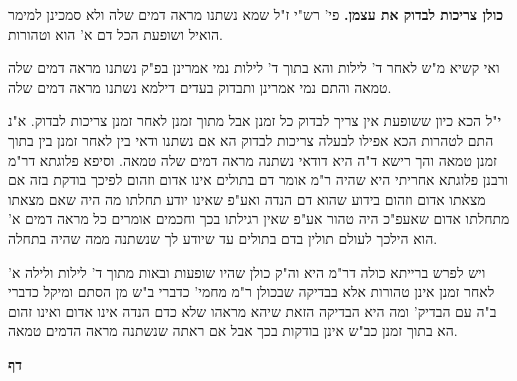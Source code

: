 \documentclass[12pt, openany]{book}
\newcommand{\sethebfont}{
\fontsize{10.5pt}{21.0pt} \selectfont
}
\newcommand{\twocol}[1]{
	{\sethebfont \begin{multicols}{2}
			#1
	\end{multicols}}	
}
\newcommand{\chapname}{}
\newcommand{\newchap}[1]{
	\addcontentsline{toc}{chapter}{#1}
	\renewcommand{\chapname}{#1}
		\begin{center}
			\textbf{%
\fontsize{16pt}{16pt}\selectfont
				#1}
		\end{center}
}
\begin{document}
\twocol{\textbf{כולן צריכות לבדוק את עצמן.}  פי' רש"י ז"ל שמא נשתנו מראה דמים שלה ולא סמכינן למימר הואיל ושופעת הכל דם א' הוא וטהורות.\par ואי קשיא מ"ש לאחר ד' לילות והא בתוך ד' לילות נמי אמרינן בפ"ק נשתנו מראה דמים שלה טמאה והתם נמי אמרינן ותבדוק בעדים דילמא נשתנו מראה דמים שלה.\par  י"ל הכא כיון ששופעת אין צריך לבדוק כל זמנן אבל מתוך זמנן לאחר זמנן צריכות לבדוק. א"נ התם לטהרות הכא אפילו לבעלה צריכות לבדוק הא אם נשתנו ודאי בין לאחר זמנן בין בתוך זמנן טמאה והך רישא ד"ה היא דודאי נשתנה מראה דמים שלה טמאה. וסיפא פלוגתא דר"מ ורבנן פלוגתא אחריתי היא שהיה ר"מ אומר דם בתולים אינו אדום וזהום לפיכך בודקת בזה אם מצאתו אדום וזהום בידוע שהוא דם הנדה ואע"פ שאינו יודע תחלתו מה היה שאם מצאתו מתחלתו אדום שאעפ"כ היה טהור אע"פ שאין רגילתו בכך וחכמים אומרים כל מראה דמים א' הוא הילכך לעולם תולין בדם בתולים עד שיודע לך שנשתנה ממה שהיה בתחלה.\par ויש לפרש ברייתא כולה דר"מ היא וה"ק כולן שהיו שופעות ובאות מתוך ד' לילות ולילה א' לאחר זמנן אינן טהורות אלא בבדיקה שבכולן ר"מ מחמי' כדברי ב"ש מן הסתם ומיקל כדברי ב"ה עם הבדיק' ומה היא הבדיקה הזאת שיהא מראהו שלא כדם הנדה אינו אדום ואינו זהום הא בתוך זמנן כב"ש אינן בודקות בכך אבל אם ראתה שנשתנה מראה הדמים טמאה. 
\par}
\newchap{דף }
\end{document}
